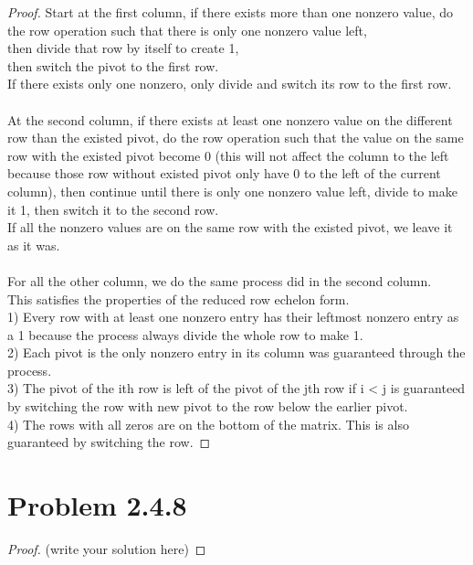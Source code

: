 \documentclass[12pt]{article}
\begin{document}
\begin{proof}
	Start at the first column, if there exists more than one nonzero value, do the row operation such that there is only one nonzero value left,
 \\then divide that row by itself to create 1,
 \\then switch the pivot to the first row.
 \\If there exists only one nonzero, only divide and switch its row to the first row.
 \\
 \\ At the second column, if there exists at least one nonzero value on the different row than the existed pivot, do the row operation such that the value on the same row with the existed pivot become 0 (this will not affect the column to the left because those row without existed pivot only have 0 to the left of the current column), then continue until there is only one nonzero value left, divide to make it 1, then switch it to the second row.
 \\If all the nonzero values are on the same row with the existed pivot, we leave it as it was.
 \\
 \\ For all the other column, we do the same process did in the second column.
 \\ This satisfies the properties of the reduced row echelon form.
 \\ 1) Every row with at least one nonzero entry has their leftmost nonzero entry as a 1 because the process always divide the whole row to make 1.
 \\ 2) Each pivot is the only nonzero entry in its column was guaranteed through the process.
 \\ 3) The pivot of the ith row is left of the pivot of the jth row if i < j is guaranteed by switching the row with new pivot to the row below the earlier pivot.
 \\ 4) The rows with all zeros are on the bottom of the matrix. This is also guaranteed by switching the row.
\end{proof}

\newpage 

\section{Problem 2.4.8}

\begin{proof}
	(write your solution here)
\end{proof}
\end{document}
